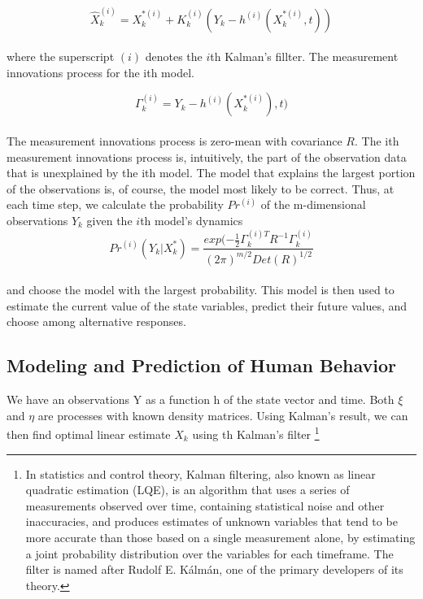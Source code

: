 \begin{equation} \label{eq:4}
\hat{X}_{k}^{(i)} = X_{k}^{*(i)} + K_k^{(i)}(Y_k - h^{(i)}(X_{k}^{*(i)},t))
\end{equation}
\\
where the superscript $(i)$ denotes the $i$th Kalman's fillter.
The measurement innovations process for the ith model.

\begin{equation} \label{eq:5}
\Gamma_k^{(i)}= Y_k - h^{(i)}(X_k^{*(i)}), t)
\end{equation}
\\
The measurement innovations process is zero-mean with covariance $R$.
The ith measurement innovations process is, intuitively, the part of the observation data that is unexplained by the ith model.
The model that explains the largest portion of the observations is, of course, the model most likely to be correct.
Thus, at each time step, we calculate the probability $Pr^{(i)}$ of the m-dimensional observations $Y_k$ given the $i$th model's dynamics
\\
\begin{equation} \label{eq:6}
Pr^{(i)}(Y_k|X_k^*) = \frac{exp(-\frac{1}{2}\Gamma_k^{(i)T}R^{-1}\Gamma_k^{(i)}}{(2\pi)^{m/2} Det(R)^{1/2}}
\end{equation}
\\
and choose the model with the largest probability.
This model is then used to estimate the current value of the state variables, predict their future values, and choose among alternative responses.

\subsection{Modeling and Prediction of Human Behavior} \label{subsec:prediction}

We have an observations Y as a function h of the state vector and time.
Both $\xi$ and $\eta$ are processes with known density matrices.
Using Kalman's result, we can then find optimal linear estimate $X_k$ using th Kalman's filter \footnote{In statistics
and control theory, Kalman filtering, also known as linear quadratic estimation (LQE), is an algorithm that
uses a series of measurements observed over time, containing statistical noise and other inaccuracies, and produces
estimates of unknown variables that tend to be more accurate than those based on a single measurement alone, by estimating
a joint probability distribution over the variables for each timeframe.
The filter is named after Rudolf E. Kálmán, one of the primary developers of its theory.}

